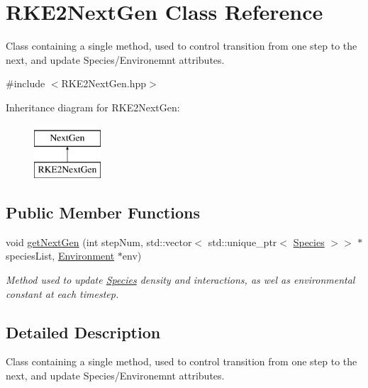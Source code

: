 \hypertarget{classRKE2NextGen}{}\section{R\+K\+E2\+Next\+Gen Class Reference}
\label{classRKE2NextGen}


Class containing a single method, used to control transition from one step to the next, and update Species/\+Environemnt attributes.  




{\ttfamily \#include $<$R\+K\+E2\+Next\+Gen.\+hpp$>$}

Inheritance diagram for R\+K\+E2\+Next\+Gen\+:\begin{figure}[H]
\begin{center}
\leavevmode
\includegraphics[height=2.000000cm]{classRKE2NextGen}
\end{center}
\end{figure}
\subsection*{Public Member Functions}
\begin{DoxyCompactItemize}
\item 
void \hyperlink{classRKE2NextGen_af91124a237998368739c0bfece6a8725}{get\+Next\+Gen} (int step\+Num, std\+::vector$<$ std\+::unique\+\_\+ptr$<$ \hyperlink{classSpecies}{Species} $>$$>$ $\ast$species\+List, \hyperlink{classEnvironment}{Environment} $\ast$env)
\begin{DoxyCompactList}\small\item\em Method used to update \hyperlink{classSpecies}{Species} density and interactions, as wel as environmental constant at each timestep. \end{DoxyCompactList}\end{DoxyCompactItemize}


\subsection{Detailed Description}
Class containing a single method, used to control transition from one step to the next, and update Species/\+Environemnt attributes. 

